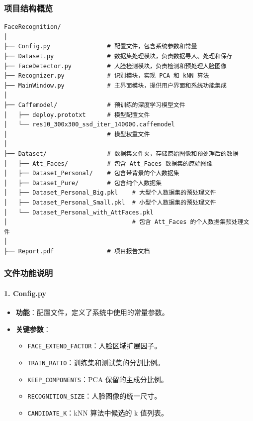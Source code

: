 \documentclass{article}
\begin{document}
\subsubsection{项目结构概览}
\begin{lstlisting}[basicstyle=\small\ttfamily]
FaceRecognition/
│
├── Config.py                # 配置文件，包含系统参数和常量
├── Dataset.py               # 数据集处理模块，负责数据导入、处理和保存
├── FaceDetector.py          # 人脸检测模块，负责检测和预处理人脸图像
├── Recognizer.py            # 识别模块，实现 PCA 和 kNN 算法
├── MainWindow.py            # 主界面模块，提供用户界面和系统功能集成
│
├── Caffemodel/              # 预训练的深度学习模型文件
│   ├── deploy.prototxt      # 模型配置文件
│   └── res10_300x300_ssd_iter_140000.caffemodel
│                            # 模型权重文件
│
├── Dataset/                 # 数据集文件夹，存储原始图像和预处理后的数据
│   ├── Att_Faces/           # 包含 Att_Faces 数据集的原始图像
│   ├── Dataset_Personal/    # 包含带背景的个人数据集
│   ├── Dataset_Pure/        # 包含纯个人数据集
│   ├── Dataset_Personal_Big.pkl    # 大型个人数据集的预处理文件
│   ├── Dataset_Personal_Small.pkl  # 小型个人数据集的预处理文件
│   └── Dataset_Personal_with_AttFaces.pkl
│                                   # 包含 Att_Faces 的个人数据集预处理文件
│
├── Report.pdf               # 项目报告文档
\end{lstlisting}

\subsubsection{文件功能说明}

\paragraph{1. Config.py}
\begin{itemize}
    \item \textbf{功能}：配置文件，定义了系统中使用的常量参数。
    \item \textbf{关键参数}：
    \begin{itemize}
        \item \texttt{FACE\_EXTEND\_FACTOR}：人脸区域扩展因子。
        \item \texttt{TRAIN\_RATIO}：训练集和测试集的分割比例。
        \item \texttt{KEEP\_COMPONENTS}：PCA 保留的主成分比例。
        \item \texttt{RECOGNITION\_SIZE}：人脸图像的统一尺寸。
        \item \texttt{CANDIDATE\_K}：kNN 算法中候选的 k 值列表。
    \end{itemize}
\end{itemize}
\end{document}
